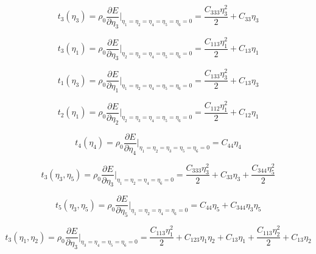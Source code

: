 \documentclass[showpacs,aps,floatfix,prb,reprint,superscriptaddress]{revtex4-1}
\begin{document}
\begin{equation}
\label{eqn:s3} 
t_{3} \left(\eta_{3}\right) = \rho_{0} \frac{\partial E}{\partial \eta_{3}}\Bigr|_{\eta_1=\eta_2=\eta_4=\eta_5=\eta_6=0} = \frac{C_{333}\eta_{3}^2}{2} + C_{33}\eta_{3}
\end{equation}


\begin{equation}
\label{eqn:s4} 
t_{3} \left(\eta_{1}\right) = \rho_{0} \frac{\partial E}{\partial \eta_{3}}\Bigr|_{\eta_2=\eta_3=\eta_4=\eta_5=\eta_6=0} = \frac{C_{113}\eta_{1}^2}{2} + C_{13}\eta_{1}
\end{equation}


\begin{equation}
\label{eqn:s5} 
t_{1} \left(\eta_{3}\right) = \rho_{0} \frac{\partial E}{\partial \eta_{1}}\Bigr|_{\eta_1=\eta_2=\eta_4=\eta_5=\eta_6=0} = \frac{C_{133}\eta_{3}^2}{2} + C_{13}\eta_{3}
\end{equation}

\begin{equation}
\label{eqn:s6} 
t_{2} \left(\eta_{1}\right) = \rho_{0} \frac{\partial E}{\partial \eta_{2}}\Bigr|_{\eta_2=\eta_3=\eta_4=\eta_5=\eta_6=0} = \frac{C_{112}\eta_{1}^2}{2} + C_{12}\eta_{1}
\end{equation}

\begin{equation}
\label{eqn:s7} 
t_{4} \left(\eta_{4}\right) = \rho_{0} \frac{\partial E}{\partial \eta_{4}}\Bigr|_{\eta_1=\eta_2=\eta_3=\eta_5=\eta_6=0} = C_{44}\eta_{4}
\end{equation}

\begin{equation}
\label{eqn:s8} 
t_{3} \left(\eta_{3}, \eta_{5}\right) = \rho_{0} \frac{\partial E}{\partial \eta_{3}}\Bigr|_{\eta_1=\eta_2=\eta_4=\eta_6=0} = \frac{C_{333}\eta_{3}^2}{2} + C_{33}\eta_{3} + \frac{C_{344}\eta_{5}^2}{2}
\end{equation}

\begin{equation}
\label{eqn:s9} 
t_{5} \left(\eta_{3}, \eta_{5}\right) = \rho_{0} \frac{\partial E}{\partial \eta_{5}}\Bigr|_{\eta_1=\eta_2=\eta_4=\eta_6=0} = C_{44}\eta_{5} + C_{344}\eta_{3}\eta_{5}
\end{equation}

\begin{equation}
\label{eqn:s10} 
t_{3} \left(\eta_{1}, \eta_{2}\right) = \rho_{0} \frac{\partial E}{\partial \eta_{3}}\Bigr|_{\eta_3=\eta_4=\eta_5=\eta_6=0} = \frac{C_{113}\eta_{1}^2}{2} + C_{123}\eta_{1}\eta_{2} + C_{13}\eta_{1} +  \frac{C_{113}\eta_{2}^2}{2} + C_{13}\eta_{2}
\end{equation}
\end{document}
